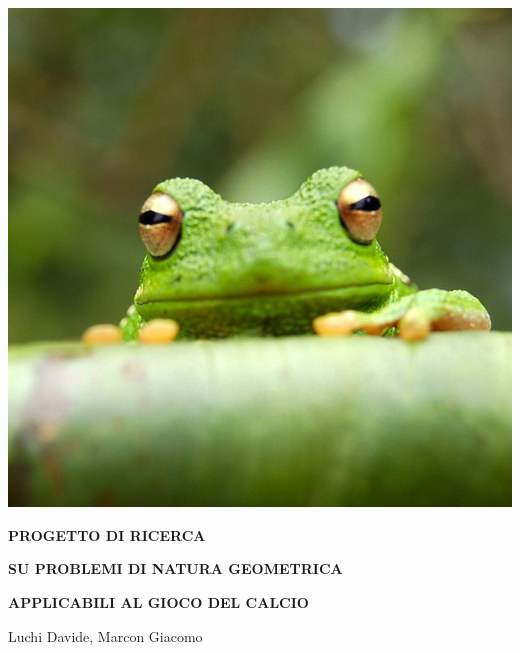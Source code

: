 \documentclass{report}
\begin{document}
\begin{titlepage}
    \centering
    \includegraphics[scale=0.35]{frog.jpg}
    
    \vspace{2cm}
    
    {\huge\textbf{PROGETTO DI RICERCA}}
    
    \vspace{0.5cm}
    
    {\LARGE\textbf{SU PROBLEMI DI NATURA GEOMETRICA}}
    
    \vspace{0.5cm}
    
    {\LARGE\textbf{APPLICABILI AL GIOCO DEL CALCIO}}
    
    \vspace{2cm}
    
    {\Large Luchi Davide, Marcon Giacomo}
    
    \vspace{2cm}
\end{titlepage}

\tableofcontents %
\end{document}

